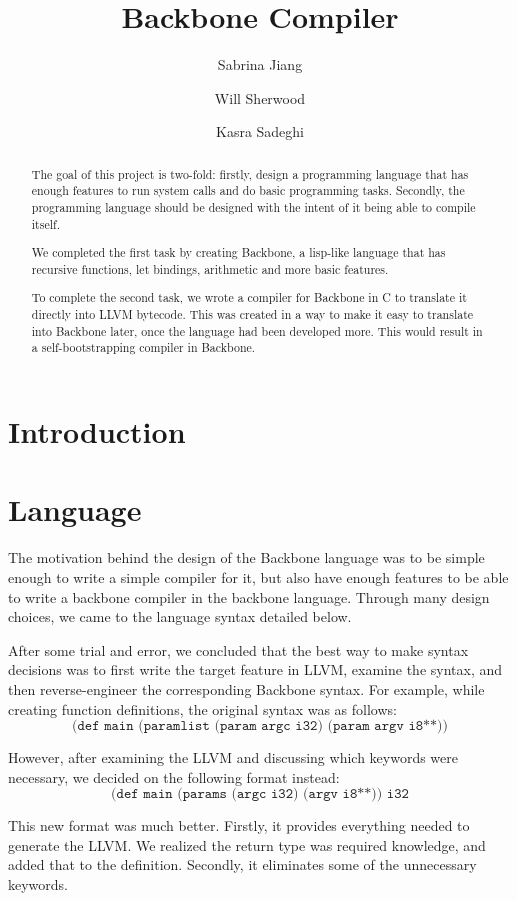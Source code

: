 \documentclass[journal=jacsat, manuscript=article]{achemso}
\author{Sabrina Jiang}
\author{Will Sherwood}
\author{Kasra Sadeghi}
\title{Backbone Compiler}
\begin{document}
\begin{abstract}

The goal of this project is two-fold: firstly, design a programming language that has enough features
to run system calls and do basic programming tasks. Secondly, the programming language should be designed with the intent of it being able to compile itself. 

We completed the first task by creating Backbone, a lisp-like language that has recursive functions, let bindings, arithmetic and more basic features. 

To complete the second task, we wrote a compiler for Backbone in C to translate it directly into LLVM bytecode. This was created in a way to make it easy to translate into Backbone later, once the language had been developed more. This would result in a self-bootstrapping compiler in Backbone.

\end{abstract}

\section{Introduction}



\section{Language}

The motivation behind the design of the Backbone language was to be
simple enough to write a simple compiler for it, but also have enough
features to be able to write a backbone compiler in the backbone language.
Through many design choices, we came to the language syntax detailed below. 

After some trial and error, we concluded that the best way to make syntax decisions was to first write the target feature in LLVM, examine the syntax, and then reverse-engineer the corresponding Backbone syntax. For example, while creating function definitions, the original syntax was as follows: 
$$\texttt{(def main (paramlist (param argc i32) (param argv i8**))}$$

However, after examining the LLVM and discussing which keywords were necessary, we decided on the following format instead:
$$\texttt{(def main (params (argc i32) (argv i8**)) i32}$$

This new format was much better. Firstly, it provides everything needed to generate the LLVM. We realized the return type was required knowledge, and added that to the definition. Secondly, it eliminates some of the unnecessary keywords.
\end{document}

